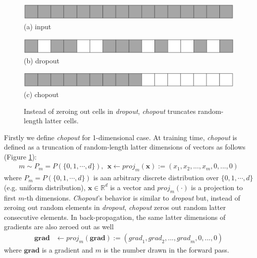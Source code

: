 \documentclass{article}
\begin{document}
    \begin{figure}
    \begin{minipage}{0.33\linewidth}
      \begin{center}
        \includegraphics[scale=0.13]{input.png}
        \hspace{1.6cm} (a) input
      \end{center}
    \end{minipage}
    \begin{minipage}{0.33\linewidth}
      \begin{center}
        \includegraphics[scale=0.13]{dropout_applied}
        \hspace{1.6cm} (b) dropout
      \end{center}
    \end{minipage}
    \begin{minipage}{0.33\linewidth}
      \begin{center}
        \includegraphics[scale=0.13]{chopout_applied.png}
        \hspace{1.6cm} (c) chopout
      \end{center}
    \end{minipage}    
    \caption{Instead of zeroing out cells in \textit{dropout}, \textit{chopout} truncates random-length latter cells.}
    \label{fig:dropout_and_chopout}
    \end{figure}
    Firstly we define \textit{chopout} for 1-dimensional case.
    At training time, \textit{chopout} is defined as a truncation of random-length latter dimensions of vectors as follows (Figure \ref{fig:dropout_and_chopout}):
    \begin{align}
        m \sim P_m = P(\{0, 1, \cdots, d\}), \ \ 
        \mathbf{x} \leftarrow {proj}_m(\mathbf{x}) := (x_1, x_2, ..., x_m, 0, ..., 0) \nonumber
    \end{align}
    where $P_m = P(\{0, 1, \cdots, d\})$ is aan arbitrary discrete distribution over $\{0, 1, \cdots, d\}$ (e.g. uniform distribution), $\mathbf{x} \in \mathbb{R}^d$ is a vector and ${proj}_m(\cdot)$ is a projection to first $m$-th dimensions. 
    \textit{Chopout}'s behavior is similar to \textit{dropout} but, instead of zeroing out random elements in \textit{dropout}, \textit{chopout} zeros out random latter consecutive elements. In back-propagation, the same latter dimensions of gradients are also zeroed out as well
    \begin{align}
        \mathbf{grad} &\leftarrow {proj}_m(\mathbf{grad}) := ({grad}_1, {grad}_2, ..., {grad}_m, 0, ..., 0) \nonumber
    \end{align}    
    where $\mathbf{grad}$ is a gradient and $m$ is the number drawn in the forward pass. 
    
\end{document}
